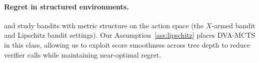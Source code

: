 \paragraph{Regret in structured environments.}
\citet{bubeck2011x} and \citet{kleinberg2008multi} study bandits with metric structure
on the action space (the $X$-armed bandit and Lipschitz bandit settings). Our
Assumption~\ref{ass:lipschitz} places DVA-MCTS in this class, allowing us to exploit
score smoothness across tree depth to reduce verifier calls while maintaining
near-optimal regret.
